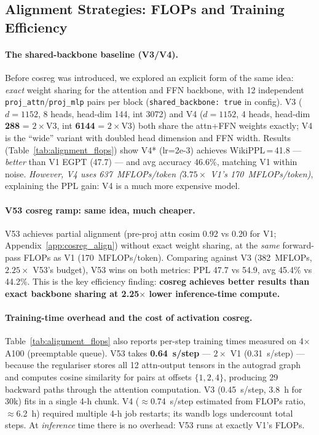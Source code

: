 \subsection{Alignment Strategies: FLOPs and Training Efficiency}
\label{sec:alignment_efficiency}

\paragraph{The shared-backbone baseline (V3/V4).}
Before cosreg was introduced, we explored an explicit form of the same idea:
\emph{exact} weight sharing for the attention and FFN backbone, with
12 independent \texttt{proj\_attn}/\texttt{proj\_mlp} pairs per block
(\texttt{shared\_backbone: true} in config).
V3 ($d{=}1152$, 8 heads, head-dim 144, int 3072)
and V4 ($d{=}1152$, 4 heads, head-dim \textbf{288} = $2{\times}$V3, int \textbf{6144} = $2{\times}$V3)
both share the attn+FFN weights exactly; V4 is the ``wide'' variant with
doubled head dimension and FFN width.
Results (Table~\ref{tab:alignment_flops}) show V4* (lr=2e-3) achieves
WikiPPL\,=\,41.8 --- \emph{better} than V1 EGPT (47.7) --- and avg accuracy 46.6\%,
matching V1 within noise.
\emph{However, V4 uses 637~MFLOPs/token ($3.75{\times}$ V1's 170~MFLOPs/token)},
explaining the PPL gain: V4 is a much more expensive model.

\paragraph{V53 cosreg ramp: same idea, much cheaper.}
V53 achieves partial alignment (pre-proj attn cosim 0.92 vs 0.20 for V1; Appendix~\ref{app:cosreg_align})
without exact weight sharing, at the \emph{same} forward-pass FLOPs as V1 (170~MFLOPs/token).
Comparing against V3 (382~MFLOPs, $2.25{\times}$ V53's budget), V53 wins on both
metrics: PPL 47.7 vs 54.9, avg 45.4\% vs 44.2\%.
This is the key efficiency finding: \textbf{cosreg achieves better results
than exact backbone sharing at 2.25${\times}$ lower inference-time compute.}

\paragraph{Training-time overhead and the cost of activation cosreg.}
Table~\ref{tab:alignment_flops} also reports per-step training times measured on
4$\times$A100 (preemptable queue).
V53 takes \textbf{0.64~s/step} --- $2{\times}$ V1 (0.31~s/step) ---
because the regulariser stores all 12 attn-output tensors in the autograd graph
and computes cosine similarity for pairs at offsets $\{1,2,4\}$, producing 29
backward paths through the attention computation.
V3 (0.45~s/step, 3.8~h for 30k) fits in a single 4-h chunk.
V4 (${\approx}$0.74~s/step estimated from FLOPs ratio, ${\approx}$6.2~h)
required multiple 4-h job restarts; its wandb logs undercount total steps.
At \emph{inference} time there is no overhead: V53 runs at exactly V1's FLOPs.

